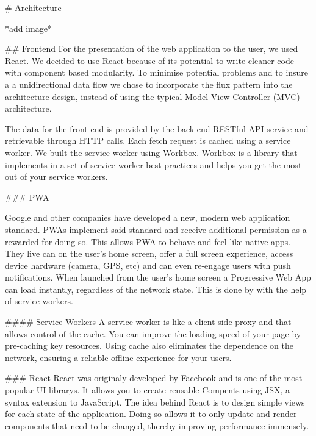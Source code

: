 \begin{markdown}


# Architecture

*add image*

## Frontend
For the presentation of the web application to the user, we used React\cite{React}. We decided to use React because of its potential to write cleaner code with component based modularity. To minimise potential problems and to insure a a unidirectional data flow we chose to incorporate  the flux pattern into the architecture design, instead of using the typical Model View Controller (MVC) architecture.

The data for the front end is provided by the back end RESTful API service and retrievable through HTTP calls. Each fetch request is cached using a service worker. We built the service worker using Workbox\cite{Workbox}. Workbox is a library that implements in a set of service worker best practices and helps you get the most out of your service workers.

### PWA
\cite{WhatIsPWA}

Google and other companies have developed a new, modern web application standard. PWAs implement said standard and receive additional permission as a rewarded for doing so. This allows PWA to behave and feel like native apps. They live can on the user's home screen, offer a full screen experience, access device hardware (camera, GPS, etc) and can even re-engage users with push notifications\cite{PWA}.  When launched from the user’s home screen a Progressive Web App can load instantly, regardless of the network state. This is done by with the help of service workers.

#### Service Workers
A service worker is like a client-side proxy and that allows control of the cache. You can improve the loading speed of your page by pre-caching key resources. Using cache also eliminates the dependence on the network, ensuring a reliable offline experience for your users.\cite{ServiceWorker}

### React
React\cite{React} was originaly developed by Facebook and is one of the most popular UI librarys. It allows you to create reusable Compents using JSX, a syntax extension to JavaScript.
The idea behind React is to design simple views for each state of the application. Doing so allows it to only update and render components that need to be changed, thereby improving performance immensely.


\end{markdown}
